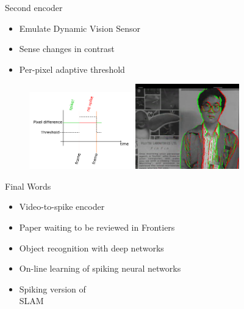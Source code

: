 \documentclass[17pt,mathserif]{beamer}
\begin{document}
    \begin{frame}{Second encoder}
      \vspace*{-2em}
      \begin{itemize}
        \item Emulate Dynamic Vision Sensor 
        \item Sense changes in contrast
        \item Per-pixel adaptive threshold
      \end{itemize}
      \vspace*{-1em}
      \begin{figure}
        \includegraphics[width=0.4\textwidth]{DVSemu} 
        \hspace*{0.1em}
        \includegraphics[width=0.4\textwidth]{dvs-emu-img}
      \end{figure}
    \end{frame}


    \begin{frame}{Final Words}
        \vspace*{-3em}
        \begin{itemize}
          \item[$\checkmark$] Video-to-spike encoder
          \item[$\checkmark$] Paper waiting to be reviewed in Frontiers
          \item[{\footnotesize [\textsc{to do}]}] Object recognition with deep networks
          \item[{\footnotesize [\textsc{to do}]}] On-line learning of spiking neural networks
          \item[{\footnotesize [\textsc{to do}]}] Spiking version of \\SLAM
        \end{itemize}
    \end{frame}
\end{document}
